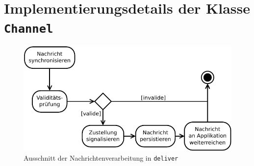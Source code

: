





\section{Implementierungsdetails der Klasse \texttt{Channel}}


\begin{figure}[htbp]
\centering
\includegraphics{grafics/processing_deliver_ovpd.pdf}%
\caption{Ausschnitt der Nachrichtenverarbeitung in \texttt{deliver}}
\label{fig:processing_deliver_ovpd}
\end{figure}

